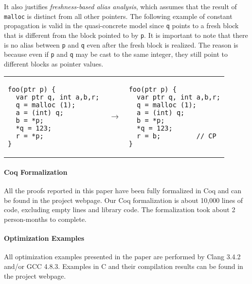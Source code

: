 It also justifies %
\textit{freshness-based alias analysis}, which assumes that the result of
\texttt{malloc} is distinct from all other pointers.  The 
following example of constant propagation is valid in the
quasi-concrete model since \texttt{q} points to a fresh block that
is different from the block pointed to by \texttt{p}.
It is important to note that there is no alias
between \texttt{p} and \texttt{q} even after
the fresh block is realized. The reason is because
even if \texttt{p} and \texttt{q} may be cast to the same integer,
they still point to different blocks as pointer values.
\begin{center}
\begin{tabular}{@{}l@{}l@{~~}l}
\begin{minipage}{0.37\textwidth}
\begin{verbatim}
foo(ptr p) {
  var ptr q, int a,b,r;
  q = malloc (1);
  a = (int) q;
  b = *p;
  *q = 123;
  r = *p;
}
\end{verbatim}
\end{minipage}
&
$~\rightarrow$
&
\begin{minipage}{0.37\textwidth}
\begin{verbatim}
foo(ptr p) {
  var ptr q, int a,b,r;
  q = malloc (1);
  a = (int) q;
  b = *p;
  *q = 123;
  r = b;         // CP
}
\end{verbatim}
\end{minipage}
\end{tabular}
\end{center}


\paragraph{Coq Formalization}
All the proofs reported in this paper have been fully formalized in
Coq and can be found in the project webpage.  Our Coq formalization is about 10,000 lines of code,
excluding empty lines and library code.  The formalization took about 2
person-months to complete.

\paragraph{Optimization Examples}
All optimization examples presented in the paper are performed by Clang
3.4.2 and/or GCC 4.8.3.  Examples in C and their compilation
results can be found in the project webpage.

